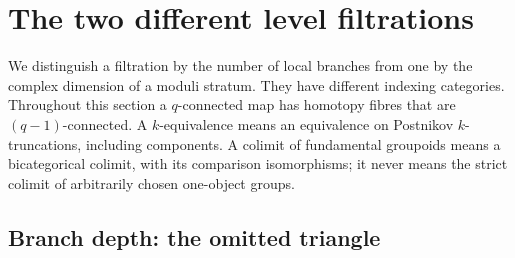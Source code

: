 \section{The two different level filtrations}\label{sec:levels}
We distinguish a filtration by the number of local branches from one by the
complex dimension of a moduli stratum.  They have different indexing
categories.  Throughout this section a $q$-connected map has homotopy fibres
that are $(q-1)$-connected.  A $k$-equivalence means an equivalence on
Postnikov $k$-truncations, including components.  A colimit of fundamental
groupoids means a bicategorical colimit, with its comparison isomorphisms;
it never means the strict colimit of arbitrarily chosen one-object groups.

\subsection{Branch depth: the omitted triangle}

